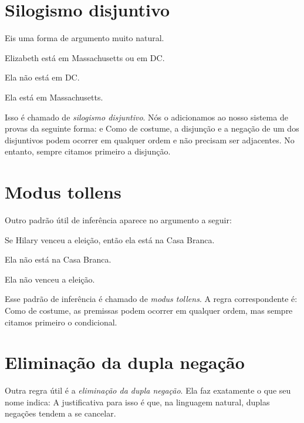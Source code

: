 \section{Silogismo disjuntivo}
Eis uma forma de argumento muito natural.
	\begin{earg}
\item Elizabeth está em Massachusetts ou em DC.
\item Ela não está em DC.
\item[\texttherefore] Ela está em Massachusetts.
	\end{earg}
Isso é chamado de \emph{silogismo disjuntivo}. Nós o adicionamos ao nosso sistema de provas da seguinte forma:
e
Como de costume, a disjunção e a negação de um dos disjuntivos podem ocorrer em qualquer ordem e não precisam ser adjacentes. No entanto, sempre citamos primeiro a disjunção.

\section{Modus tollens}
Outro padrão útil de inferência aparece no argumento a seguir:
	\begin{earg}
		\item Se Hilary venceu a eleição, então ela está na Casa Branca.
		\item Ela não está na Casa Branca.
		\item[\texttherefore] Ela não venceu a eleição.
	\end{earg}
Esse padrão de inferência é chamado de \emph{modus tollens}. A regra correspondente é:
Como de costume, as premissas podem ocorrer em qualquer ordem, mas sempre citamos primeiro o condicional.

\section{Eliminação da dupla negação}
Outra regra útil é a \emph{eliminação da dupla negação}. Ela faz exatamente o que seu nome indica:
A justificativa para isso é que, na linguagem natural, duplas negações tendem a se cancelar.

